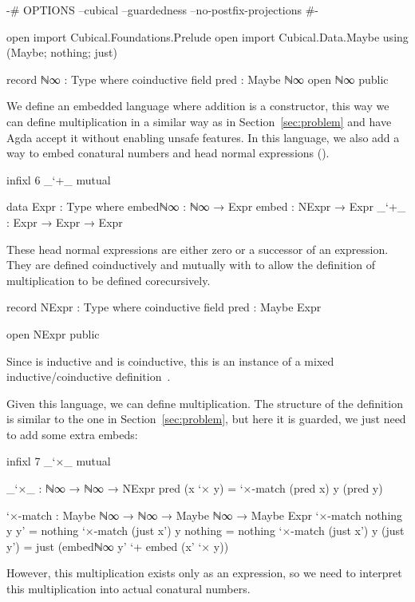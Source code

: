 \begin{code}[hide]
{-# OPTIONS --cubical --guardedness --no-postfix-projections #-}

open import Cubical.Foundations.Prelude
open import Cubical.Data.Maybe using (Maybe; nothing; just)

record ℕ∞ : Type where
  coinductive
  field
    pred : Maybe ℕ∞
open ℕ∞ public
\end{code}
We define an embedded language where addition is a constructor, this way we can
define multiplication in a similar way as in Section~\ref{sec:problem} and have
Agda accept it without enabling unsafe features. In this language, we also add a
way to embed conatural numbers and head normal expressions ().
\begin{code}[hide]
infixl 6 _`+_
mutual
\end{code}
\begin{code}
  data Expr : Type where
    embedℕ∞  : ℕ∞ → Expr
    embed    : NExpr → Expr
    _`+_     : Expr → Expr → Expr
\end{code}
These head normal expressions are either zero or a successor of an expression.
They are defined coinductively and mutually with  to allow
the definition of multiplication to be defined corecursively.
\begin{code}
  record NExpr : Type where
    coinductive
    field
      pred : Maybe Expr
\end{code}
\begin{code}[hide]
open NExpr public
\end{code}
Since  is inductive and  is coinductive,
this is an instance of a mixed inductive/coinductive
definition~\cite{hancock-stream}.

Given this language, we can define multiplication. The structure of
the definition is similar to the one in Section~\ref{sec:problem}, but here it
is guarded, we just need to add some extra embeds:
\begin{code}[hide]
infixl 7 _`×_
mutual
\end{code}
\begin{code}
  _`×_ : ℕ∞ → ℕ∞ → NExpr
  pred (x `× y) = `×-match (pred x) y (pred y)

  `×-match :
    Maybe ℕ∞ → ℕ∞ → Maybe ℕ∞ → Maybe Expr
  `×-match nothing    y y'         = nothing
  `×-match (just x')  y nothing    = nothing
  `×-match (just x')  y (just y')  =
    just (embedℕ∞ y' `+ embed (x' `× y))
\end{code}
However, this multiplication exists only as an expression, so we need to
interpret this multiplication into actual conatural numbers.

